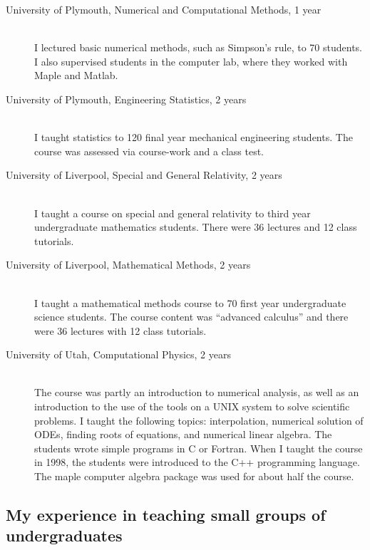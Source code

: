 \documentclass[12pt]{article}
\begin{document}
\begin{description}
  \item[University of Plymouth, Numerical and Computational Methods,
1 year] \hfill \\
I lectured basic numerical methods,
such as Simpson's rule,
 to 70 students. I also supervised
students in the computer lab, where they worked with Maple
and Matlab.

  \item[University of Plymouth, Engineering Statistics,
2 years] \hfill \\
I taught statistics to 120 final year mechanical engineering 
students. The course was assessed via course-work and a class 
test.

  \item[University of Liverpool, Special and General
Relativity,
2 years] \hfill \\
I taught a course on special and general
relativity to third year undergraduate mathematics students. 
There were 36 lectures and 12 class tutorials.

  \item[University of Liverpool, Mathematical Methods, 2 years] \hfill \\
I taught a mathematical methods course
 to 70 first year undergraduate science students.  The course
content was ``advanced calculus'' and there were 36 lectures 
with 12 class tutorials.


\item[University of Utah, Computational Physics, 2 years] \hfill \\
The course was partly an introduction to numerical
analysis, as well as an introduction to the use of the tools on a UNIX
system to solve scientific problems.  I taught the following topics:
interpolation, numerical solution of ODEs, finding roots of
equations, and numerical linear algebra.  The students wrote simple
programs in C or Fortran. When I taught the course in 1998, the
students were introduced to the C++ programming language. The maple
computer algebra package was used for about half the course.


\end{description}

\subsection{My experience in teaching small groups of undergraduates}
\end{document}
